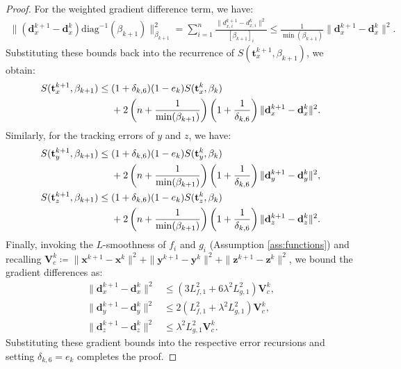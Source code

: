 \documentclass{article}
\theoremstyle{plain}
\theoremstyle{definition}
\theoremstyle{remark}
\begin{document}
\begin{proof}
For the weighted gradient difference term, we have:
\begin{align*}
    \big\|(\mathbf{d}_{x}^{k+1}-\mathbf{d}_{x}^{k})\mathrm{diag}^{-1}(\beta_{k+1})\big\|_{\beta_{k+1}}^{2} = \sum_{i=1}^{n}\frac{\|d_{x,i}^{k+1}-d_{x,i}^{k}\|^{2}}{[\beta_{k+1}]_{i}} \leq \frac{1}{\min(\beta_{k+1})} \|\mathbf{d}_{x}^{k+1}-\mathbf{d}_{x}^{k}\|^{2}.
\end{align*}
Substituting these bounds back into the recurrence of $S(\mathbf{t}_{x}^{k+1},\beta_{k+1})$, we obtain:
\begin{align*}
    S(\mathbf{t}_{x}^{k+1},\beta_{k+1}) \leq{}& (1+\delta_{k,6})(1-e_k)S(\mathbf{t}_{x}^{k},\beta_{k}) \notag \\
    &+ 2\left(n+\frac{1}{\min(\beta_{k+1})}\right)\left(1+\frac{1}{\delta_{k,6}}\right)\|\mathbf{d}_{x}^{k+1}-\mathbf{d}_{x}^{k}\|^{2}.
\end{align*}
Similarly, for the tracking errors of $y$ and $z$, we have:
\begin{align*}
    S(\mathbf{t}_{y}^{k+1},\beta_{k+1}) \leq{}& (1+\delta_{k,6})(1-e_{k})S(\mathbf{t}_{y}^{k},\beta_{k}) \notag \\
    &+ 2\left(n+\frac{1}{\min(\beta_{k+1})}\right)\left(1+\frac{1}{\delta_{k,6}}\right)\|\mathbf{d}_{y}^{k+1}-\mathbf{d}_{y}^{k}\|^{2}, \\
    S(\mathbf{t}_{z}^{k+1},\beta_{k+1}) \leq{}& (1+\delta_{k,6})(1-e_{k})S(\mathbf{t}_{z}^{k},\beta_{k}) \notag \\
    &+ 2\left(n+\frac{1}{\min(\beta_{k+1})}\right)\left(1+\frac{1}{\delta_{k,6}}\right)\|\mathbf{d}_{z}^{k+1}-\mathbf{d}_{z}^{k}\|^{2}.
\end{align*}
Finally, invoking the $L$-smoothness of $f_{i}$ and $g_{i}$ (Assumption \ref{ass:functions}) and recalling $\mathbf{V}_{c}^{k} \coloneqq \|\mathbf{x}^{k+1}-\mathbf{x}^{k}\|^{2}+\|\mathbf{y}^{k+1}-\mathbf{y}^{k}\|^{2} + \|\mathbf{z}^{k+1}-\mathbf{z}^{k}\|^{2}$, we bound the gradient differences as:
\begin{align*}
    \|\mathbf{d}_{x}^{k+1}-\mathbf{d}_{x}^{k}\|^{2} &\leq (3L_{f,1}^{2}+6\lambda^{2}L_{g,1}^{2}) \mathbf{V}_{c}^{k}, \\
    \|\mathbf{d}_{y}^{k+1}-\mathbf{d}_{y}^{k}\|^{2} &\leq 2(L_{f,1}^{2}+\lambda^{2}L_{g,1}^{2}) \mathbf{V}_{c}^{k}, \\
    \|\mathbf{d}_{z}^{k+1}-\mathbf{d}_{z}^{k}\|^{2} &\leq \lambda^{2}L_{g,1}^{2} \mathbf{V}_{c}^{k}.
\end{align*}
Substituting these gradient bounds into the respective error recursions and setting $\delta_{k,6}=e_{k}$ completes the proof.
\end{proof}
\end{document}
